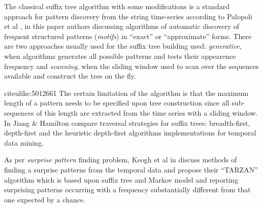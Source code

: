 The classical suffix tree algorithm \cite{citeulike:707616} with some modifications is a standard approach for pattern discovery from the string time-series according to Palopoli et al \cite{citeulike:5003338}, in this paper authors discussing algorithms of automatic discovery of frequent structured patterns (\textit{motifs}) in ``exact'' or ``approximate'' forms. There are two approaches usually used for the suffix tree building used: \textit{generative}, when algorithms generates all possible patterns and tests their appearence frequency \cite{citeulike:5012661} and \textit{scanning}, when the sliding window used to scan over the sequences available and construct the tree on the fly. 

citeulike:5012661 The certain limitation of the algorithm is that the maximum length of a pattern needs to be specified upon tree construction since all sub-sequences of this length are extracted from the time series with a sliding window. In \cite{citeulike:5003404} Jiang \& Hamilton compare traversal strategies for suffix trees: breadth-first, depth-first and the heuristic depth-first algorithms implementations for temporal data mining.

As per \textit{surprise pattern} finding problem, Keogh et al in \cite{citeulike:3025877} discuss methods of finding a surprise patterns from the temporal data and propose their ``TARZAN'' algorithm which is based upon suffix tree and Markov model and reporting surprising patterns occurring with a frequency substantially different from that one expected by a chance.


